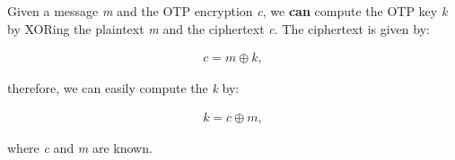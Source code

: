 Given a message \emph{m} and the OTP encryption \emph{c}, we \textbf{can} compute
the OTP key \emph{k} by XORing the plaintext \emph{m} and the ciphertext \emph{c}.
The ciphertext is given by:

\begin{align*}
    c = m \oplus k,
\end{align*}

therefore, we can easily compute the \emph{k} by:

\begin{align*}
    k = c \oplus m,
\end{align*}

where \emph{c} and \emph{m} are known.
